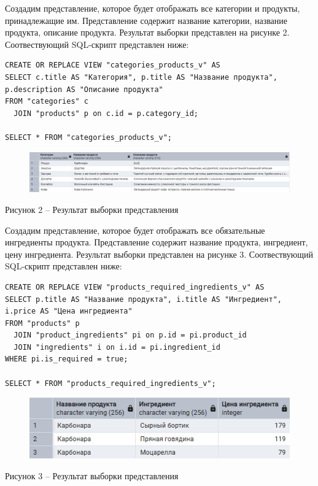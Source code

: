 \documentclass[a4paper,14pt]{extarticle}
\begin{document}
  Создадим представление, которое будет отображать все категории и продукты, принадлежащие им. Представление содержит название категории, название продукта, описание продукта. Результат выборки представлен на рисунке 2. Соотвествующий SQL-скрипт представлен ниже:

  \noindent
  \begin{Verbatim}[tabsize=4,fontsize=\small]
CREATE OR REPLACE VIEW "categories_products_v" AS
SELECT c.title AS "Категория", p.title AS "Название продукта", 
p.description AS "Описание продукта"
FROM "categories" c
  JOIN "products" p on c.id = p.category_id;

SELECT * FROM "categories_products_v";
  \end{Verbatim}

  \begin{figure}[h]
    \centering
    \includegraphics[width=1\linewidth]{img/view-2}
  \end{figure}
  \begin{center}
    Рисунок 2 – Результат выборки представления
  \end{center}

  Создадим представление, которое будет отображать все обязательные ингредиенты продукта. Представление содержит название продукта, ингредиент, цену ингредиента. Результат выборки представлен на рисунке 3. Соотвествующий SQL-скрипт представлен ниже:

  \noindent
  \begin{Verbatim}[tabsize=4,fontsize=\small]
CREATE OR REPLACE VIEW "products_required_ingredients_v" AS
SELECT p.title AS "Название продукта", i.title AS "Ингредиент", 
i.price AS "Цена ингредиента" 
FROM "products" p
  JOIN "product_ingredients" pi on p.id = pi.product_id
  JOIN "ingredients" i on i.id = pi.ingredient_id
WHERE pi.is_required = true;

SELECT * FROM "products_required_ingredients_v";
  \end{Verbatim}

  \begin{figure}[h]
    \centering
    \includegraphics[width=0.75\linewidth]{img/view-3}
  \end{figure}
  \begin{center}
    Рисунок 3 – Результат выборки представления
  \end{center}
\end{document}
